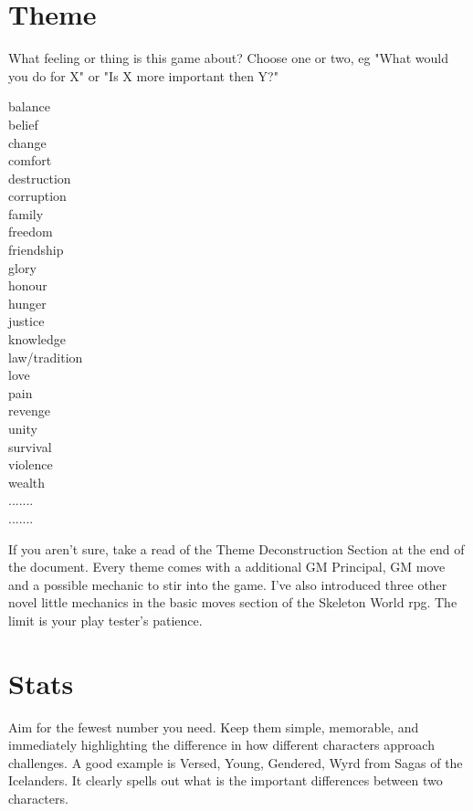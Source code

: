 \documentclass{tufte-handout}
\begin{document}
\section{Theme}
What feeling or thing is this game about?
Choose one or two, eg
"What would you do for X"
or
"Is X more important then Y?"

\begin{multicols}{3}
balance\\
belief\\
change\\
comfort\\
destruction \\
corruption\\
family \\
freedom\\
friendship\\
glory\\
honour\\
hunger\\
justice\\
knowledge \\
law/tradition\\
love\\
pain\\
revenge\\
unity\\
survival\\
violence\\
wealth\\
.......\\
.......\\
\end{multicols}


If you aren't sure, take a read of the Theme Deconstruction Section at the end of the document. Every theme comes with a additional GM Principal, GM move and a possible mechanic to stir into the game. I've also introduced three other novel little mechanics in the basic moves section of the Skeleton World rpg. The limit is your play tester's patience.

\section{Stats}
Aim for the fewest number you need. Keep them simple, memorable, and immediately highlighting the difference in how different characters approach challenges. A good example is Versed, Young, Gendered, Wyrd from Sagas of the Icelanders. It clearly spells out what is the important differences between two characters.
\end{document}
